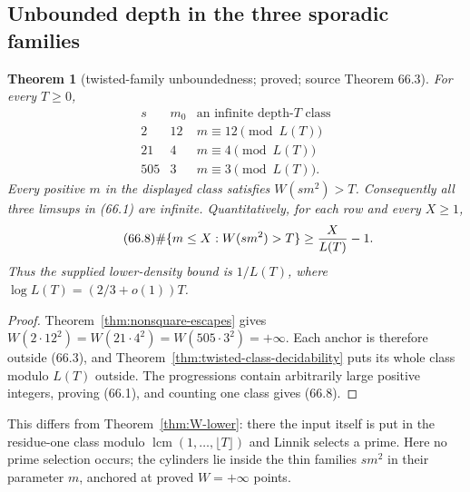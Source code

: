\documentclass[10pt,reqno]{amsart}
\newtheorem{theorem}{Theorem}[section]
\theoremstyle{definition}
\newcommand{\lcm}{\operatorname {lcm}}
\newcommand{\1}{\mathbf 1}
\begin{document}
\subsection{Unbounded depth in the three sporadic families}
\begin{theorem}[twisted-family unboundedness; proved; source Theorem 66.3]
\label{thm:twisted-family-unbounded}
For every $T\geq0$,
\begin{equation}\tag{66.7}
 \begin{array}{c|c|c}
 s&m_0&\text{an infinite depth-$T$ class}\\ \hline
 2&12&m\equiv12\pmod {L(T)}\\
 21&4&m\equiv4\pmod {L(T)}\\
 505&3&m\equiv3\pmod {L(T)}.
 \end{array}
\end{equation}
Every positive $m$ in the displayed class satisfies $W(sm^2)>T$.
Consequently all three limsups in (66.1) are infinite.  Quantitatively, for
each row and every $X\geq1$,
\begin{equation}\tag{66.8}
 \#\{m\leq X:W(sm^2)>T\}\geq {X\over L(T)}-1.
\end{equation}
Thus the supplied lower-density bound is $1/L(T)$, where
$\log L(T)=(2/3+o(1))T$.
\end{theorem}
\begin{proof}
Theorem~\ref{thm:nonsquare-escapes} gives
$W(2\cdot12^2)=W(21\cdot4^2)=W(505\cdot3^2)=+\infty$.  Each anchor is
therefore outside (66.3), and Theorem~\ref{thm:twisted-class-decidability}
puts its whole class modulo $L(T)$ outside.  The progressions contain
arbitrarily large positive integers, proving (66.1), and counting one class
gives (66.8).
\end{proof}
This differs from Theorem~\ref{thm:W-lower}: there the input itself is put
in the residue-one class modulo $\lcm(1,\ldots,\lfloor T\rfloor)$ and Linnik
selects a prime.  Here no prime selection occurs; the cylinders lie inside
the thin families $sm^2$ in their parameter $m$, anchored at proved
$W=+\infty$ points.
\end{document}
